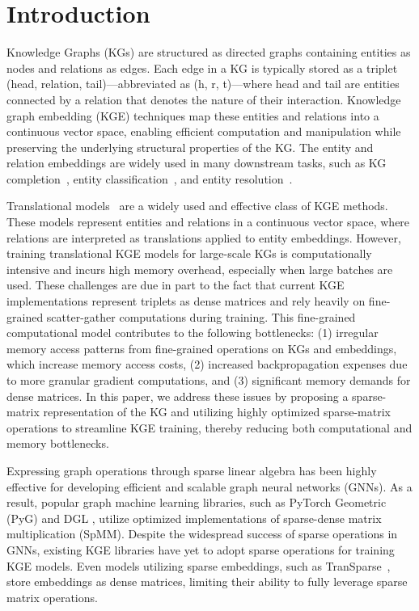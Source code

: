 \section{Introduction}
\label{introductoin}


Knowledge Graphs (KGs) are structured as directed graphs containing entities as nodes and relations as edges.
Each edge in a KG is typically stored as a triplet (head, relation, tail)—abbreviated as (h, r, t)—where head and tail are entities connected by a relation that denotes the nature of their interaction. Knowledge graph embedding (KGE) techniques map these entities and relations into a continuous vector space, enabling efficient computation and manipulation while preserving the underlying structural properties of the KG.
The entity and relation embeddings are widely used in many downstream tasks, such as KG
completion~\cite{TransE, chen2020knowledge}, entity classification~\cite{nickel2012factorizing}, and entity resolution~\cite{bordes2014semantic}.


Translational models~\cite{TransE, transR} are a widely used and effective class of KGE methods. 
These models represent entities and relations in a continuous vector space, where relations are interpreted as translations applied to entity embeddings. 
However, training translational KGE models for large-scale KGs is computationally intensive and incurs high memory overhead, especially when large batches are used. 
These challenges are due in part to the fact that current KGE implementations represent triplets as dense matrices and rely heavily on fine-grained scatter-gather computations during training.
This fine-grained computational model contributes to the following bottlenecks: (1) irregular memory access patterns from fine-grained operations on KGs and embeddings, which increase memory access costs, (2) increased backpropagation expenses due to more granular gradient computations, and (3) significant memory demands for dense matrices.
In this paper, we address these issues by proposing a sparse-matrix representation of the KG and utilizing highly optimized sparse-matrix operations to streamline KGE training, thereby reducing both computational and memory bottlenecks.


Expressing graph operations through sparse linear algebra has been highly effective for developing efficient and scalable graph neural networks (GNNs). As a result, popular graph machine learning libraries, such as PyTorch Geometric (PyG) \cite{fey2019fast} and DGL \cite{wang2019deep}, utilize optimized implementations of sparse-dense matrix multiplication (SpMM).
Despite the widespread success of sparse operations in GNNs, existing KGE libraries have yet to adopt sparse operations for training KGE models. Even models utilizing sparse embeddings, such as TranSparse~\cite{transSparse}, store embeddings as dense matrices, limiting their ability to fully leverage sparse matrix operations.


